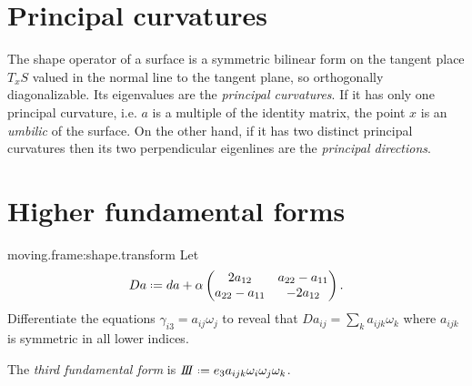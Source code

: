 \section{Principal curvatures}
The shape operator of a surface is a symmetric bilinear form on the tangent place \(T_x S\) valued in the normal line to the tangent plane, so orthogonally diagonalizable.
Its eigenvalues are the \emph{principal curvatures}.
If it has only one principal curvature, i.e. \(a\) is a multiple of the identity matrix, the point \(x\) is an \emph{umbilic} of the surface.
On the other hand, if it has two distinct principal curvatures then its two perpendicular eigenlines are the \emph{principal directions}.

\section{Higher fundamental forms}
\begin{problem}{moving.frame:shape.transform}
Let
\[
Da\defeq
da
+
\alpha
\begin{pmatrix}
2 a_{12} & a_{22}-a_{11}\\
a_{22}-a_{11} & -2a_{12}
\end{pmatrix}.
\]
Differentiate the equations \(\gamma_{i3}=a_{ij}\omega_j\) to reveal that \(Da_{ij}=\sum_k a_{ijk}\omega_k\) where \(a_{ijk}\) is symmetric in all lower indices.
\end{problem}
The \emph{third fundamental form} is
\(\thirdFundForm\defeq e_3 a_{ijk} \omega_i\omega_j\omega_k\).


